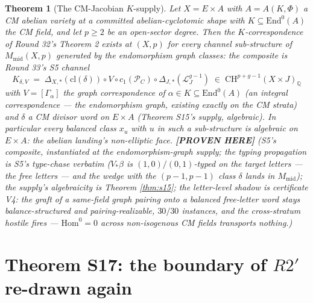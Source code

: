 \documentclass[11pt]{article}
\newtheorem{theorem}{Theorem}
\newcommand{\PROVEN}{\textbf{[PROVEN HERE]}}
\newcommand{\Q}{\mathbb{Q}}
\newcommand{\CH}{\mathrm{CH}}
\newcommand{\Hom}{\mathrm{Hom}}
\newcommand{\End}{\mathrm{End}}
\begin{document}
\begin{theorem}[The CM-Jacobian $K$-supply]\label{thm:s16}
Let $X=E\times A$ with $A=A(K,\Phi)$ a CM abelian variety at a committed
abelian-cyclotomic shape with $K\subseteq\End^0(A)$ the CM field, and let
$p\ge2$ be an open-sector degree. Then the $K$-correspondence of Round 32's
Theorem 2 exists at $(X,p)$ for every channel sub-structure of
$M_{\mathrm{mid}}(X,p)$ generated by the endomorphism graph classes: the
composite is Round 33's S5 channel
\[
K_{\delta,V}\;=\;\Delta_{X,*}(\mathrm{cl}(\delta))\circ V\circ
c_1(\mathcal P_C)\circ\Delta_{J,*}(\mathcal L_J^{g-1})
\;\in\;\CH^{p+g-1}(X\times J)_\Q
\]
with $V=[\Gamma_\alpha]$ the \emph{graph correspondence of
$\alpha\in K\subseteq\End^0(A)$} (an integral correspondence --- the
endomorphism graph, existing exactly on the CM strata) and $\delta$ a
\emph{CM divisor word} on $E\times A$ (Theorem S15's supply, algebraic). In
particular every balanced class $x_u$ with $u$ in such a sub-structure is
algebraic on $E\times A$: the abelian landing's non-elliptic face.
\PROVEN{} (S5's composite, instantiated at the endomorphism-graph supply; the
typing propagation is S5's type-chase verbatim ($V_*\beta$ is $(1,0)/(0,1)$-typed
on the target letters --- the free letters --- and the wedge with the
$(p-1,p-1)$ class $\delta$ lands in $M_{\mathrm{mid}}$); the supply's
algebraicity is Theorem \ref{thm:s15}; the letter-level shadow is certificate
V4: the graft of a same-field graph pairing onto a balanced free-letter word
stays balance-structured and pairing-realizable, $30/30$ instances, and the
cross-stratum hostile fires --- $\Hom^0=0$ across non-isogenous CM fields
transports nothing.)
\end{theorem}

\section{Theorem S17: the boundary of \texorpdfstring{$R2'$}{R2'} re-drawn again}
\end{document}
